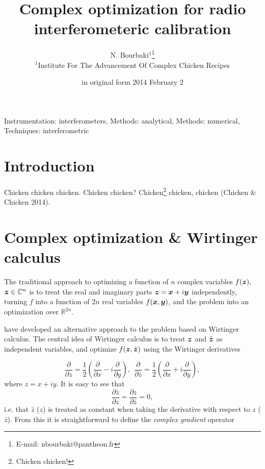 \documentclass[useAMS,usenatbib]{mn2e}
\title[Complex optimization for radio interferometeric calibration]{Complex optimization for radio interferometeric calibration}
\author[N. Bourbaki]{N. Bourbaki$^1$\thanks{E-mail: nbourbaki@pantheon.fr}\\ 
$^1$Institute For The Advancement Of Complex Chicken Recipes}
\newcommand{\COMPLEX}{\mathbb{C}}
\newcommand{\REAL}{\mathbb{R}}
\newcommand{\zz}{\bmath{z}}
\begin{document}
\date{in original form 2014 February 2}

\pagerange{\pageref{firstpage}--\pageref{lastpage}} 

\maketitle

\label{firstpage}

\begin{abstract}
\end{abstract}

\begin{keywords}
Instrumentation: interferometers, Methods: analytical, Methods: numerical, Techniques: interferometric
\end{keywords}

\section{Introduction}

Chicken chicken chicken. Chicken chicken? Chicken\footnote{Chicken chicken!} chicken, chicken (Chicken \& Chicken 2014).

\section{Complex optimization \& Wirtinger calculus}

The traditional approach to optimizing a function of $n$ complex variables $f(\zz),$ $\zz\in\COMPLEX^n$ is
to treat the real and imaginary parts $\zz=\bmath{x}+i\bmath{y}$ independently, turning $f$ into a function
of $2n$ real variables $f(\bmath{x},\bmath{y})$, and the problem into an optimization over $\REAL^{2n}$.

\citet{ComplexOpt} have developed an alternative approach to the problem based on Wirtinger calculus. The central idea
of Wirtinger calculus is to treat $\zz$ and $\bar{\zz}$ as independent variables, and optimize $f(\zz,\bar{\zz})$
using the Wirtinger derivatives 

\[
\frac{\partial}{\partial z} = \frac{1}{2}\left ( \frac{\partial}{\partial x} - i\frac{\partial}{\partial y} \right),~~
\frac{\partial}{\partial \bar{z}} = \frac{1}{2}\left ( \frac{\partial}{\partial x} + i\frac{\partial}{\partial y} \right),
\]
where $z=x+iy$. It is easy to see that  
\[
\frac{\partial \bar z}{\partial z} = 
\frac{\partial z}{\partial \bar z} = 0,
\]
i.e. that $\bar z$ ($z$) is treated as constant when taking the derivative with respect to $z$ ($\bar z$). From this 
it is straightforward to define the \emph{complex gradient} operator 
\end{document}
